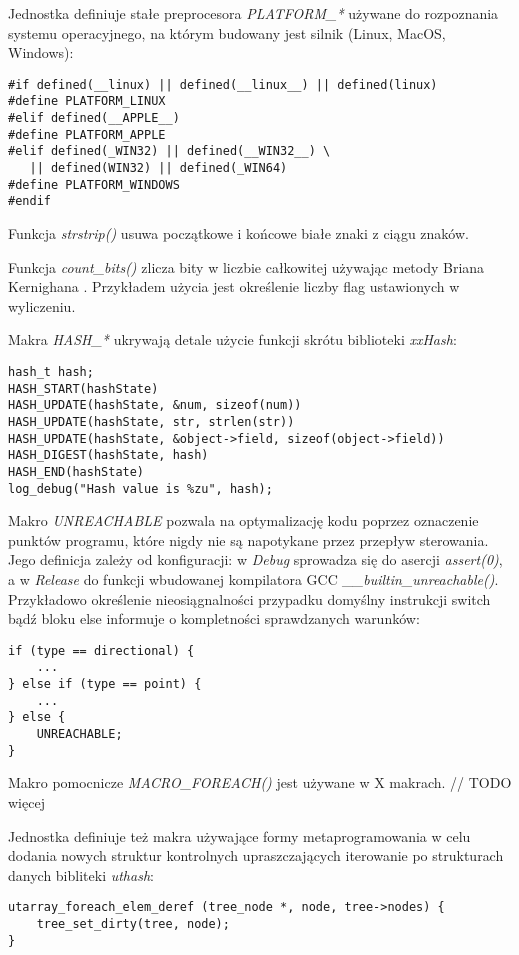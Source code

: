 Jednostka definiuje stałe preprocesora \textit{PLATFORM\_*} używane do rozpoznania systemu operacyjnego, na którym budowany jest silnik (Linux, MacOS, Windows):
\lstset{language=C}
\begin{lstlisting}
#if defined(__linux) || defined(__linux__) || defined(linux)
#define PLATFORM_LINUX
#elif defined(__APPLE__)
#define PLATFORM_APPLE
#elif defined(_WIN32) || defined(__WIN32__) \
   || defined(WIN32) || defined(_WIN64)
#define PLATFORM_WINDOWS
#endif
\end{lstlisting}

Funkcja \textit{strstrip()} usuwa początkowe i końcowe białe znaki z ciągu znaków.

Funkcja \textit{count\_bits()} zlicza bity w liczbie całkowitej używając metody Briana Kernighana \cite{BITTWIDDLINGHACKS}. Przykładem użycia jest określenie liczby flag ustawionych w wyliczeniu.

Makra \textit{HASH\_*} ukrywają detale użycie funkcji skrótu biblioteki \textit{xxHash}:
\lstset{language=C}
\begin{lstlisting}
hash_t hash;
HASH_START(hashState)
HASH_UPDATE(hashState, &num, sizeof(num))
HASH_UPDATE(hashState, str, strlen(str))
HASH_UPDATE(hashState, &object->field, sizeof(object->field))
HASH_DIGEST(hashState, hash)
HASH_END(hashState)
log_debug("Hash value is %zu", hash);
\end{lstlisting}

Makro \textit{UNREACHABLE} pozwala na optymalizację kodu poprzez oznaczenie punktów programu, które nigdy nie są napotykane przez przepływ sterowania.
Jego definicja zależy od konfiguracji: w \textit{Debug} sprowadza się do asercji \textit{assert(0)}, a w \textit{Release} do funkcji wbudowanej kompilatora GCC \textit{\_\_builtin\_unreachable()}.
Przykładowo określenie nieosiągnalności przypadku domyślny instrukcji switch bądź bloku else informuje o
kompletności sprawdzanych warunków:
\lstset{language=C}
\begin{lstlisting}
if (type == directional) {
	...
} else if (type == point) {
	...
} else {
	UNREACHABLE;
}
\end{lstlisting}

Makro pomocnicze \textit{MACRO\_FOREACH()} jest używane w X makrach. // TODO więcej

Jednostka definiuje też makra używające formy metaprogramowania w celu dodania nowych struktur kontrolnych \cite{METACONTROLC} upraszczających iterowanie po strukturach danych bibliteki \textit{uthash}:
\lstset{language=C}
\begin{lstlisting}
utarray_foreach_elem_deref (tree_node *, node, tree->nodes) {
	tree_set_dirty(tree, node);
}
\end{lstlisting}


